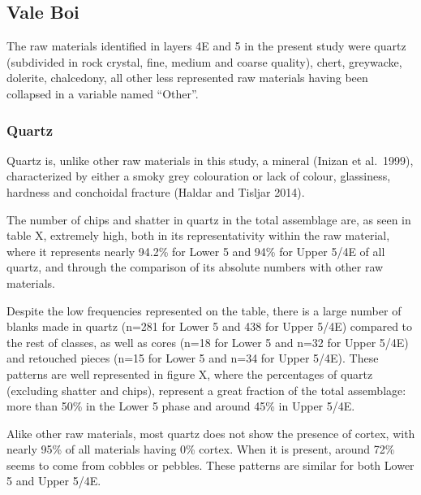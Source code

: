 \documentclass[12pt,twoside]{reedthesis}
\begin{document}
\hypertarget{vale-boi-3}{%
\subsection{Vale Boi}\label{vale-boi-3}}

The raw materials identified in layers 4E and 5 in the present study were quartz (subdivided in rock crystal, fine, medium and coarse quality), chert, greywacke, dolerite, chalcedony, all other less represented raw materials having been collapsed in a variable named ``Other''.

\hypertarget{quartz}{%
\subsubsection{Quartz}\label{quartz}}

Quartz is, unlike other raw materials in this study, a mineral (Inizan et al.~1999), characterized by either a smoky grey colouration or lack of colour, glassiness, hardness and conchoidal fracture (Haldar and Tisljar 2014).

The number of chips and shatter in quartz in the total assemblage are, as seen in table X, extremely high, both in its representativity within the raw material, where it represents nearly 94.2\% for Lower 5 and 94\% for Upper 5/4E of all quartz, and through the comparison of its absolute numbers with other raw materials.

Despite the low frequencies represented on the table, there is a large number of blanks made in quartz (n=281 for Lower 5 and 438 for Upper 5/4E) compared to the rest of classes, as well as cores (n=18 for Lower 5 and n=32 for Upper 5/4E) and retouched pieces (n=15 for Lower 5 and n=34 for Upper 5/4E). These patterns are well represented in figure X, where the percentages of quartz (excluding shatter and chips), represent a great fraction of the total assemblage: more than 50\% in the Lower 5 phase and around 45\% in Upper 5/4E.

Alike other raw materials, most quartz does not show the presence of cortex, with nearly 95\% of all materials having 0\% cortex. When it is present, around 72\% seems to come from cobbles or pebbles. These patterns are similar for both Lower 5 and Upper 5/4E.
\end{document}
